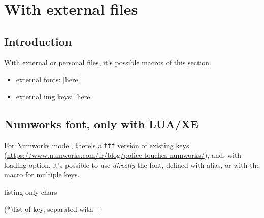 \documentclass[11pt,a4paper]{ltxdoc}
\begin{document}
\begin{DemoCode}{}
\CalcKey[model={83},type=gray,font=\small\fontKEY]{(-)}
\end{DemoCode}

\pagebreak

\section{With external files}

\subsection{Introduction}

With external or personal files, it's possible macros of this section.

\begin{itemize}
	\item external fonts: \href{https://packages.cpierquet.fr/packages/graphiques/calculatoritems/calculatoritems_fonts.zip}{[here]}
	\item external img keys: \href{https://packages.cpierquet.fr/packages/graphiques/calculatoritems/calculatoritems_keys.zip}{[here]}
\end{itemize}

\subsection{Numworks font, only with LUA/XE}

For \textsf{Numworks} model, there's a \texttt{ttf} version of existing keys (\url{https://www.numworks.com/fr/blog/police-touches-numworks/}), and, with \ShowCode{[xelua]} loading option, it's possible to use \textit{directly} the font, defined with  \ShowCode{\\fontkeyNWKS} alias, or with the macro for multiple keys.

\begin{DemoCode}{listing only}
{\fontkeyNWKS chars}

\CalcKeyNwks(*){list of key, separated with +}
\end{DemoCode}
\end{document}
